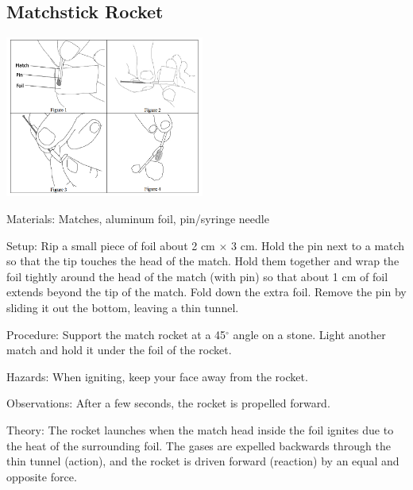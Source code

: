 \begin{multicols}{2}
\subsection{Matchstick Rocket}

\begin{center}
\includegraphics[width=0.49\textwidth]{./img/matchstick-rocket-1.png}
\end{center}

\begin{description*}
\item[Materials:]{Matches, aluminum foil, pin/syringe needle}
\item[Setup:]{Rip a small piece of foil about 2 cm $\times$ 3 cm. Hold the pin next to a match so that the tip touches the head of the match. Hold them together and wrap the foil tightly around the head of the match (with pin) so that about 1 cm of foil extends beyond the tip of the match. Fold down the extra foil. Remove the pin by sliding it out the bottom, leaving a thin tunnel. }
\item[Procedure:]{Support the match rocket at a 45$^\circ$ angle on a stone. Light another match and hold it under the foil of the rocket.}
\item[Hazards:]{When igniting, keep your face away from the rocket.}
\item[Observations:]{After a few seconds, the rocket is propelled forward.}
\item[Theory:]{The rocket launches when the match head inside the foil ignites due to the heat of the surrounding foil. The gases are expelled backwards through the thin tunnel (action), and the rocket is driven forward (reaction) by an equal and opposite force.}
\end{description*}


\end{multicols}
